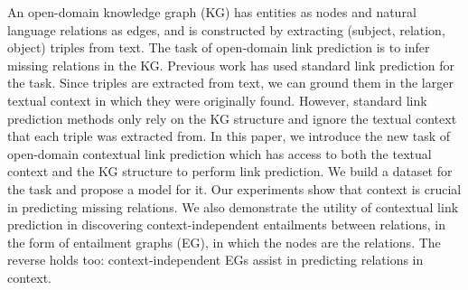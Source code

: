 An open-domain knowledge graph (KG) has entities as nodes and natural language relations as edges, and is constructed by extracting (subject, relation, object) triples from text. The task of open-domain link prediction is to infer missing relations in the KG. Previous work has used standard link prediction for the task. Since triples are extracted from text, we can ground them in the larger textual context in which they were originally found. However, standard link prediction methods only rely on the KG structure and ignore the textual context that each triple was extracted from. In this paper, we introduce the new task of open-domain contextual link prediction which has access to both the textual context and the KG structure to perform link prediction. We build a dataset for the task and propose a model for it. Our experiments show that context is crucial in predicting missing relations. We also demonstrate the utility of contextual link prediction in discovering context-independent entailments between relations, in the form of entailment graphs (EG), in which the nodes are the relations. The reverse holds too: context-independent EGs assist in predicting relations in context.
